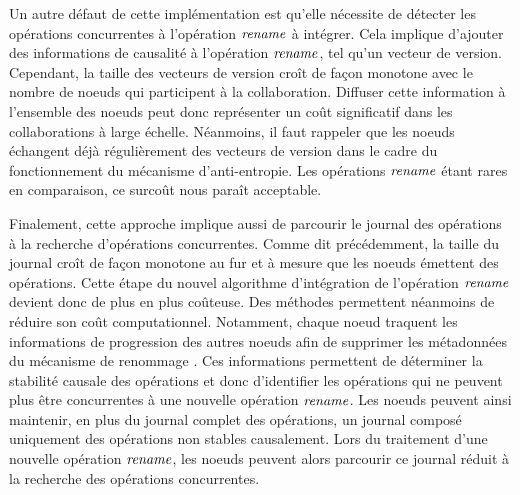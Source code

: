 Un autre défaut de cette implémentation est qu'elle nécessite de détecter les opérations concurrentes à l'opération $\mathit{rename}$ à intégrer.
Cela implique d'ajouter des informations de causalité à l'opération $\mathit{rename}$, tel qu'un vecteur de version.
Cependant, la taille des vecteurs de version croît de façon monotone avec le nombre de noeuds qui participent à la collaboration.
Diffuser cette information à l'ensemble des noeuds peut donc représenter un coût significatif dans les collaborations à large échelle.
Néanmoins, il faut rappeler que les noeuds échangent déjà régulièrement des vecteurs de version dans le cadre du fonctionnement du mécanisme d'anti-entropie.
Les opérations $\mathit{rename}$ étant rares en comparaison, ce surcoût nous paraît acceptable.

Finalement, cette approche implique aussi de parcourir le journal des opérations à la recherche d'opérations concurrentes.
Comme dit précédemment, la taille du journal croît de façon monotone au fur et à mesure que les noeuds émettent des opérations.
Cette étape du nouvel algorithme d'intégration de l'opération $\mathit{rename}$ devient donc de plus en plus coûteuse.
Des méthodes permettent néanmoins de réduire son coût computationnel.
Notamment, chaque noeud traquent les informations de progression des autres noeuds afin de supprimer les métadonnées du mécanisme de renommage .
Ces informations permettent de déterminer la stabilité causale des opérations et donc d'identifier les opérations qui ne peuvent plus être concurrentes à une nouvelle opération $\mathit{rename}$.
Les noeuds peuvent ainsi maintenir, en plus du journal complet des opérations, un journal composé uniquement des opérations non stables causalement.
Lors du traitement d'une nouvelle opération $\mathit{rename}$, les noeuds peuvent alors parcourir ce journal réduit à la recherche des opérations concurrentes.
